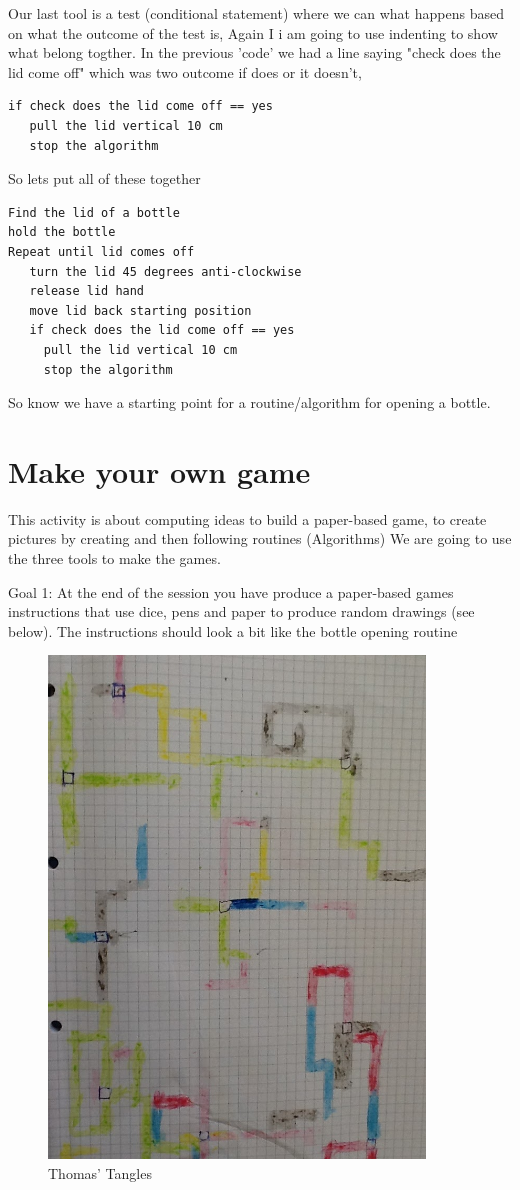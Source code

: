 Our last tool is a test (conditional statement) where we can what happens based on what the outcome of the test is, Again I i am going to use indenting to show what belong togther. In the previous 'code' we had a line saying "check does the lid come off" which was two outcome if does or it doesn't,

\begin{lstlisting}
if check does the lid come off == yes
   pull the lid vertical 10 cm
   stop the algorithm
\end{lstlisting}

So lets put all of these together
\begin{lstlisting}
Find the lid of a bottle
hold the bottle
Repeat until lid comes off
   turn the lid 45 degrees anti-clockwise
   release lid hand 
   move lid back starting position
   if check does the lid come off == yes
     pull the lid vertical 10 cm
     stop the algorithm
\end{lstlisting}

So know we have a starting point for a routine/algorithm for opening a bottle. 

\section{Make your own game}
This activity is about computing ideas to build a paper-based game, to create pictures by creating and then following routines (Algorithms) We are going to use the three tools to make the games. 

Goal 1: At the end of the session you have produce a paper-based games instructions that use dice, pens and paper to produce random drawings (see below). The instructions should look a bit like the bottle opening routine 

\begin{figure}
    \centering
    \includegraphics[width=10cm]{chapters/chapterCT1/figures/tt1.JPG}
    \caption{Thomas' Tangles}
    \label{fig:ThomasTangles1}
\end{figure}

